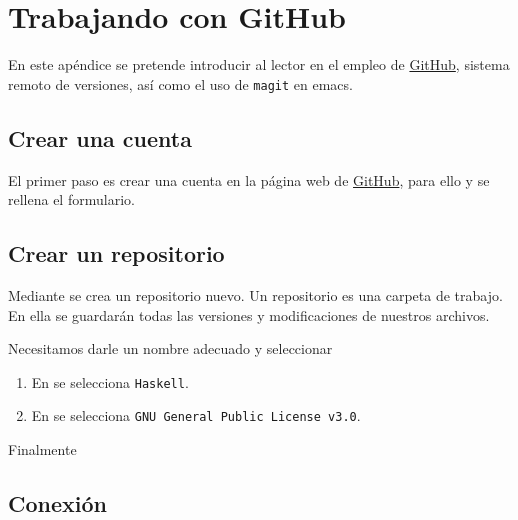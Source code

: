 \chapter{Trabajando con GitHub} \label{aped.B}

En este apéndice se pretende introducir al lector en el empleo de
\href{https://github.com/}{GitHub}, sistema remoto de versiones, así como el uso
de \texttt{magit} en emacs.

\section{Crear una cuenta}

El primer paso es crear una cuenta en la página web de
\href{https://github.com/}{GitHub}, para ello  y se
rellena el formulario.

\section{Crear un repositorio}

Mediante  se crea un repositorio nuevo.  Un
repositorio es una carpeta de trabajo. En ella se guardarán todas las versiones
y modificaciones de nuestros archivos.

Necesitamos darle un nombre adecuado y seleccionar
\begin{enumerate}
\item En  se selecciona \texttt{Haskell}.
\item En  se selecciona \texttt{GNU General Public License v3.0}.
\end{enumerate}

Finalmente 

\section{Conexión}

